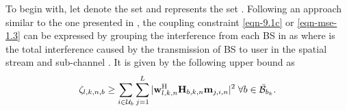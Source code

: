 To begin with, let  denote the set  and  represents the set . Following an approach similar to the one presented in \cite{pennanen2011decentralized,tolli2011decentralized}, the coupling constraint \eqref{eqn-9.1c} or \eqref{eqn-mse-1.3} can be expressed by grouping the interference from each \ac{BS} in  as
\iftoggle{single_column}{
\begin{equation}\label{eqn-decent-3}
\beta_{l,k,n} \geq \sum_{\substack{j = 1\\j \neq l}}^L |\mvec{w}{l,k,n}^\herm \mvec{H}{b_k,k,n} \mvec{m}{j,k,n} |^2 + \sum_{i \in \mc{U}_{b_k} \backslash \{k\}} \sum_{j = 1}^L |\mvec{w}{l,k,n}^\herm \mvec{H}{b_k,k,n} \mvec{m}{j,i,n} |^2 + \sum_{b \in \bar{\mc{B}}_{b_k}} \zeta_{l,k,n,b} \; + \; \enoise
\end{equation}}{\allowdisplaybreaks
\begin{multline}\label{eqn-decent-3}
\enoise + \sum_{\substack{j = 1,j \neq l}}^L |\mvec{w}{l,k,n}^\herm \mvec{H}{b_k,k,n} \mvec{m}{j,k,n} |^2 + \sum_{b \in \bar{\mc{B}}_{b_k}} \zeta_{l,k,n,b}  \\
+ \sum_{i \in \mc{U}_{b_k} \backslash \{k\}} \sum_{j = 1}^L |\mvec{w}{l,k,n}^\herm \mvec{H}{b_k,k,n} \mvec{m}{j,i,n} |^2 \leq \beta_{l,k,n}
\end{multline}}
where  is the total interference caused by the transmission of \ac{BS}  to user  in the spatial stream  and sub-channel . It is given by the following upper bound as
\begin{equation} \label{inter_exp}
\zeta_{l,k,n,b} \geq \sum_{i \in \mc{U}_b} \sum_{j = 1}^L |\mvec{w}{l,k,n}^\herm \mvec{H}{b,k,n} \mvec{m}{j,i,n} |^2 \; \forall b \in \bar{\mc{B}}_{b_k}.
\end{equation}

